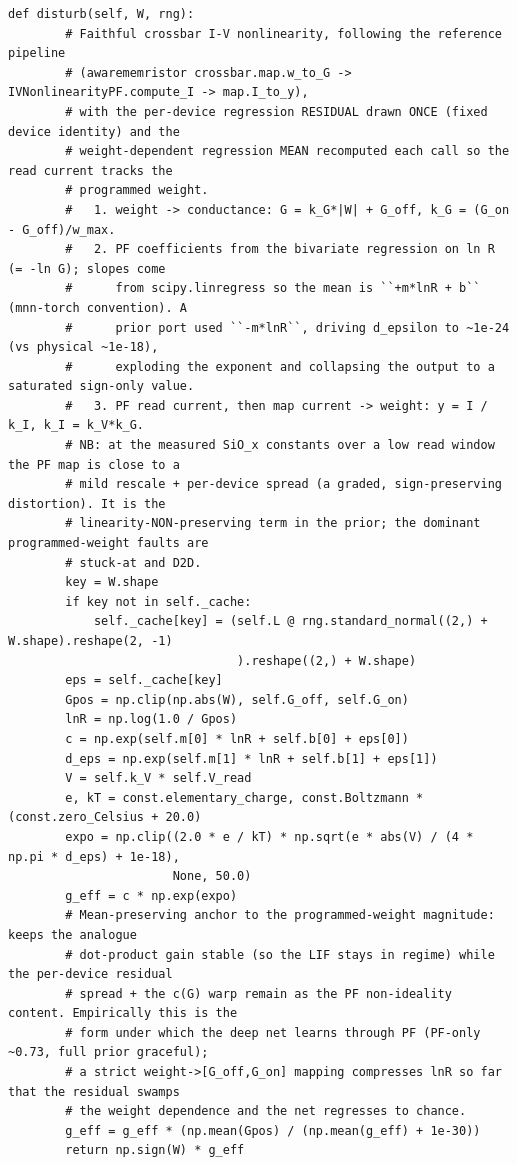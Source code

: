 \begin{lstlisting}[caption={mrl\_trace/device\_faults.py},label={lst:siox-src-device_faults}]
    def disturb(self, W, rng):
        # Faithful crossbar I-V nonlinearity, following the reference pipeline
        # (awarememristor crossbar.map.w_to_G -> IVNonlinearityPF.compute_I -> map.I_to_y),
        # with the per-device regression RESIDUAL drawn ONCE (fixed device identity) and the
        # weight-dependent regression MEAN recomputed each call so the read current tracks the
        # programmed weight.
        #   1. weight -> conductance: G = k_G*|W| + G_off, k_G = (G_on - G_off)/w_max.
        #   2. PF coefficients from the bivariate regression on ln R (= -ln G); slopes come
        #      from scipy.linregress so the mean is ``+m*lnR + b`` (mnn-torch convention). A
        #      prior port used ``-m*lnR``, driving d_epsilon to ~1e-24 (vs physical ~1e-18),
        #      exploding the exponent and collapsing the output to a saturated sign-only value.
        #   3. PF read current, then map current -> weight: y = I / k_I, k_I = k_V*k_G.
        # NB: at the measured SiO_x constants over a low read window the PF map is close to a
        # mild rescale + per-device spread (a graded, sign-preserving distortion). It is the
        # linearity-NON-preserving term in the prior; the dominant programmed-weight faults are
        # stuck-at and D2D.
        key = W.shape
        if key not in self._cache:
            self._cache[key] = (self.L @ rng.standard_normal((2,) + W.shape).reshape(2, -1)
                                ).reshape((2,) + W.shape)
        eps = self._cache[key]
        Gpos = np.clip(np.abs(W), self.G_off, self.G_on)
        lnR = np.log(1.0 / Gpos)
        c = np.exp(self.m[0] * lnR + self.b[0] + eps[0])
        d_eps = np.exp(self.m[1] * lnR + self.b[1] + eps[1])
        V = self.k_V * self.V_read
        e, kT = const.elementary_charge, const.Boltzmann * (const.zero_Celsius + 20.0)
        expo = np.clip((2.0 * e / kT) * np.sqrt(e * abs(V) / (4 * np.pi * d_eps) + 1e-18),
                       None, 50.0)
        g_eff = c * np.exp(expo)
        # Mean-preserving anchor to the programmed-weight magnitude: keeps the analogue
        # dot-product gain stable (so the LIF stays in regime) while the per-device residual
        # spread + the c(G) warp remain as the PF non-ideality content. Empirically this is the
        # form under which the deep net learns through PF (PF-only ~0.73, full prior graceful);
        # a strict weight->[G_off,G_on] mapping compresses lnR so far that the residual swamps
        # the weight dependence and the net regresses to chance.
        g_eff = g_eff * (np.mean(Gpos) / (np.mean(g_eff) + 1e-30))
        return np.sign(W) * g_eff



\end{lstlisting}
